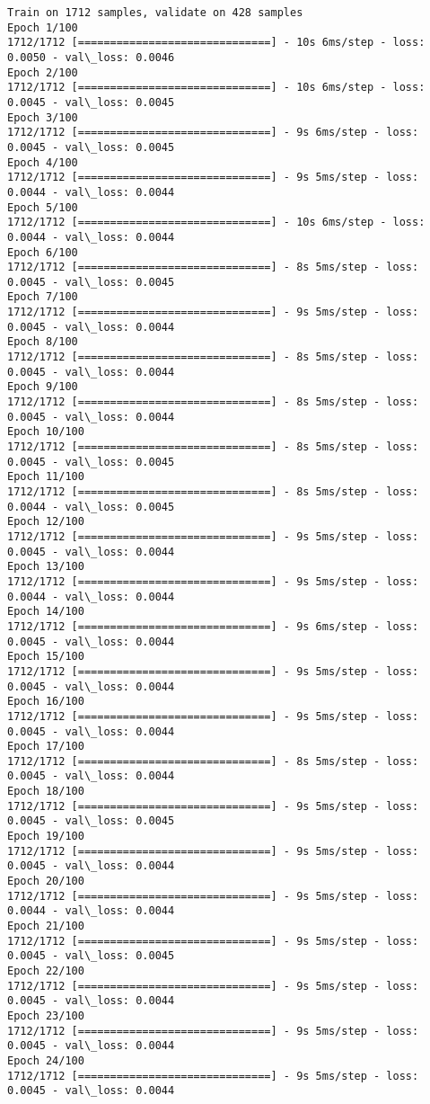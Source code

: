 \documentclass[11pt]{article}
\begin{document}
    \begin{Verbatim}[commandchars=\\\{\}]
Train on 1712 samples, validate on 428 samples
Epoch 1/100
1712/1712 [==============================] - 10s 6ms/step - loss: 0.0050 - val\_loss: 0.0046
Epoch 2/100
1712/1712 [==============================] - 10s 6ms/step - loss: 0.0045 - val\_loss: 0.0045
Epoch 3/100
1712/1712 [==============================] - 9s 6ms/step - loss: 0.0045 - val\_loss: 0.0045
Epoch 4/100
1712/1712 [==============================] - 9s 5ms/step - loss: 0.0044 - val\_loss: 0.0044
Epoch 5/100
1712/1712 [==============================] - 10s 6ms/step - loss: 0.0044 - val\_loss: 0.0044
Epoch 6/100
1712/1712 [==============================] - 8s 5ms/step - loss: 0.0045 - val\_loss: 0.0045
Epoch 7/100
1712/1712 [==============================] - 9s 5ms/step - loss: 0.0045 - val\_loss: 0.0044
Epoch 8/100
1712/1712 [==============================] - 8s 5ms/step - loss: 0.0045 - val\_loss: 0.0044
Epoch 9/100
1712/1712 [==============================] - 8s 5ms/step - loss: 0.0045 - val\_loss: 0.0044
Epoch 10/100
1712/1712 [==============================] - 8s 5ms/step - loss: 0.0045 - val\_loss: 0.0045
Epoch 11/100
1712/1712 [==============================] - 8s 5ms/step - loss: 0.0044 - val\_loss: 0.0045
Epoch 12/100
1712/1712 [==============================] - 9s 5ms/step - loss: 0.0045 - val\_loss: 0.0044
Epoch 13/100
1712/1712 [==============================] - 9s 5ms/step - loss: 0.0044 - val\_loss: 0.0044
Epoch 14/100
1712/1712 [==============================] - 9s 6ms/step - loss: 0.0045 - val\_loss: 0.0044
Epoch 15/100
1712/1712 [==============================] - 9s 5ms/step - loss: 0.0045 - val\_loss: 0.0044
Epoch 16/100
1712/1712 [==============================] - 9s 5ms/step - loss: 0.0045 - val\_loss: 0.0044
Epoch 17/100
1712/1712 [==============================] - 8s 5ms/step - loss: 0.0045 - val\_loss: 0.0044
Epoch 18/100
1712/1712 [==============================] - 9s 5ms/step - loss: 0.0045 - val\_loss: 0.0045
Epoch 19/100
1712/1712 [==============================] - 9s 5ms/step - loss: 0.0045 - val\_loss: 0.0044
Epoch 20/100
1712/1712 [==============================] - 9s 5ms/step - loss: 0.0044 - val\_loss: 0.0044
Epoch 21/100
1712/1712 [==============================] - 9s 5ms/step - loss: 0.0045 - val\_loss: 0.0045
Epoch 22/100
1712/1712 [==============================] - 9s 5ms/step - loss: 0.0045 - val\_loss: 0.0044
Epoch 23/100
1712/1712 [==============================] - 9s 5ms/step - loss: 0.0045 - val\_loss: 0.0044
Epoch 24/100
1712/1712 [==============================] - 9s 5ms/step - loss: 0.0045 - val\_loss: 0.0044

\end{Verbatim}
\end{document}

